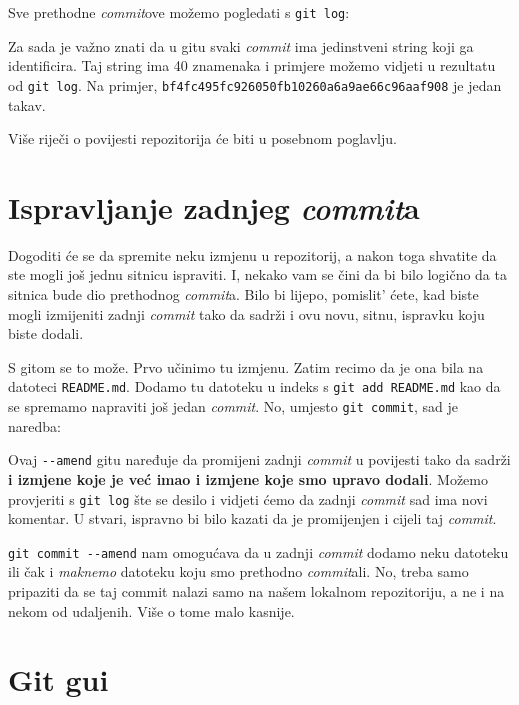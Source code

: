 Sve prethodne \emph{commit}ove možemo pogledati s \verb+git log+:



Za sada je važno znati da u gitu svaki \emph{commit} ima jedinstveni string koji ga identificira.
Taj string ima 40 znamenaka i primjere možemo vidjeti u rezultatu od \verb+git log+.
Na primjer, \verb+bf4fc495fc926050fb10260a6a9ae66c96aaf908+ je jedan takav.

Više riječi o povijesti repozitorija će biti u posebnom poglavlju. 

\section*{Ispravljanje zadnjeg \emph{commit}a}

Dogoditi će se da spremite neku izmjenu u repozitorij, a nakon toga shvatite da ste mogli još jednu sitnicu ispraviti.
I, nekako vam se čini da bi bilo logično da ta sitnica bude dio prethodnog \emph{commit}a.
Bilo bi lijepo, pomislit' ćete, kad biste mogli izmijeniti zadnji \emph{commit} tako da sadrži i ovu novu, sitnu, ispravku koju biste dodali.

S gitom se to može.
Prvo učinimo tu izmjenu. 
Zatim recimo da je ona bila na datoteci \verb+README.md+.
Dodamo tu datoteku u indeks s \verb+git add README.md+ kao da se spremamo napraviti još jedan \emph{commit}.
No, umjesto \verb+git commit+, sad je naredba:


Ovaj \verb+--amend+ gitu naređuje da promijeni zadnji \emph{commit} u povijesti tako da sadrži \textbf{i izmjene koje je već imao i izmjene koje smo upravo dodali}.
Možemo provjeriti s \verb+git log+ šte se desilo i vidjeti ćemo da zadnji \emph{commit} sad ima novi komentar.
U stvari, ispravno bi bilo kazati da je promijenjen i cijeli taj \emph{commit}.

\verb+git commit --amend+ nam omogućava da u zadnji \emph{commit} dodamo neku datoteku ili čak i \emph{maknemo} datoteku koju smo prethodno \emph{commit}ali. 
No, treba samo pripaziti da se taj commit nalazi samo na našem lokalnom repozitoriju, a ne i na nekom od udaljenih. 
Više o tome malo kasnije.

\section*{Git gui}

